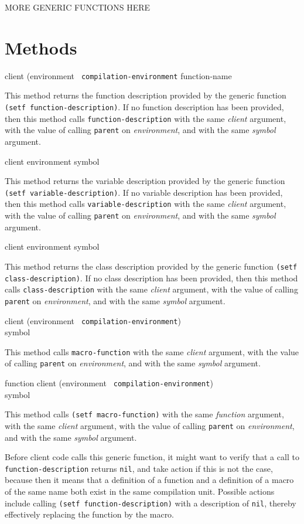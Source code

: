 MORE GENERIC FUNCTIONS HERE

\section{Methods}

 {client (environment {\tt
    compilation-environment} function-name}

This method returns the function description provided by the generic function
\texttt{(setf function-description)}. If no function description has been
provided, then this method calls \texttt{function-description} with the same
\textit{client} argument, with the value of calling \texttt{parent} on
\textit{environment}, and with the same \textit{symbol} argument.

 {client environment symbol}

This method returns the variable description provided by the generic function
\texttt{(setf variable-description)}. If no variable description has been
provided, then this method calls \texttt{variable-description} with the same
\textit{client} argument, with the value of calling \texttt{parent} on
\textit{environment}, and with the same \textit{symbol} argument.

 {client environment symbol}

This method returns the class description provided by the generic function
\texttt{(setf class-description)}. If no class description has been provided,
then this method calls \texttt{class-description} with the same
\textit{client} argument, with the value of calling \texttt{parent} on
\textit{environment}, and with the same \textit{symbol} argument.

{\small{} {client (environment {\tt
      compilation-environment}) \\ symbol}
}

This method calls \texttt{macro-function} with the same
\textit{client} argument, with the value of calling \texttt{parent} on
\textit{environment}, and with the same \textit{symbol} argument.

{\small{} {function client (environment {\tt
      compilation-environment}) \\ symbol}
}

This method calls \texttt{(setf macro-function)} with the same
\textit{function} argument, with the same \textit{client} argument, with
the value of calling \texttt{parent} on \textit{environment}, and with
the same \textit{symbol} argument.

Before client code calls this generic function, it might want to
verify that a call to \texttt{function-description} returns
\texttt{nil}, and take action if this is not the case, because then it
means that a definition of a function and a definition of a macro of
the same name both exist in the same compilation unit.  Possible
actions include calling \texttt{(setf function-description)} with a
description of \texttt{nil}, thereby effectively replacing the
function by the macro.
